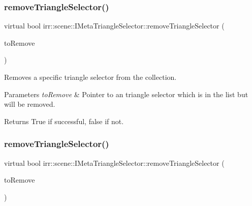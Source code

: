 \subsubsection{\texorpdfstring{remove\+Triangle\+Selector()}{removeTriangleSelector()}\hspace{0.1cm}{\footnotesize\ttfamily [1/2]}}
{\footnotesize\ttfamily virtual bool irr\+::scene\+::\+I\+Meta\+Triangle\+Selector\+::remove\+Triangle\+Selector (\begin{DoxyParamCaption}\item[{\hyperlink{classirr_1_1scene_1_1ITriangleSelector}{I\+Triangle\+Selector} $\ast$}]{to\+Remove }\end{DoxyParamCaption})\hspace{0.3cm}{\ttfamily [pure virtual]}}



Removes a specific triangle selector from the collection. 


\begin{DoxyParams}{Parameters}
{\em to\+Remove} & Pointer to an triangle selector which is in the list but will be removed. \\
\hline
\end{DoxyParams}
\begin{DoxyReturn}{Returns}
True if successful, false if not. 
\end{DoxyReturn}
\mbox{\label{classirr_1_1scene_1_1IMetaTriangleSelector_ac1534f0bb8bb24a196ae262f3a80f32d}} 
\subsubsection{\texorpdfstring{remove\+Triangle\+Selector()}{removeTriangleSelector()}\hspace{0.1cm}{\footnotesize\ttfamily [2/2]}}
{\footnotesize\ttfamily virtual bool irr\+::scene\+::\+I\+Meta\+Triangle\+Selector\+::remove\+Triangle\+Selector (\begin{DoxyParamCaption}\item[{\hyperlink{classirr_1_1scene_1_1ITriangleSelector}{I\+Triangle\+Selector} $\ast$}]{to\+Remove }\end{DoxyParamCaption})\hspace{0.3cm}{\ttfamily [pure virtual]}}



